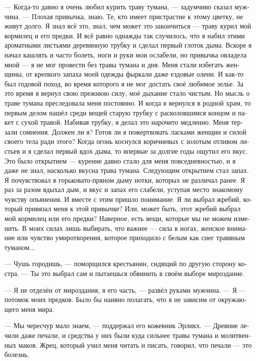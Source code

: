 \documentclass[a4paper,12pt,fleqn]{book}\usepackage{polyglossia}\setdefaultlanguage[babelshorthands=true]{russian}\setotherlanguage{english}\defaultfontfeatures{Ligatures=TeX,Mapping=tex-text}\usepackage{xcolor}\newcommand{\ml}[3]{#2}
\begin{document}
{--- Когда-то давно я очень любил курить траву тумана, --- задумчиво сказал мужчина.
--- Плохая привычка, знаю.
Те, кто имеет пристрастие к этому цветку, не живут долго.
Я знал всё это, знал, чем может это закончиться --- траву курил мой кормилец и его предки.
И всё равно однажды так случилось, что я набил этими ароматными листьями деревянную трубку и сделал первый глоток дыма.
Вскоре я начал кашлять и часто болеть, ноги и руки мои ослабели, но привычка овладела мной --- я не мог провести без травы тумана и дня.
Меня стали избегать женщины, от крепкого запаха моей одежды фыркали даже ездовые олени.
И как-то был годовой поход, во время которого я не мог достать своё любимое зелье.
За это время я вернул свою прежнюю силу, моё дыхание стало чистым.
Но мысль о траве тумана преследовала меня постоянно.
И когда я вернулся в родной храм, то первым делом нашёл среди вещей старую трубку с расколовшимся концом и пакет с сухой травой.
Набивая трубку, я делал это нарочито медленно.
Меня терзали сомнения.
Должен ли я?
Готов ли я пожертвовать ласками женщин и силой своего тела ради этого?
Когда огонь коснулся коричневых с золотым отливом листьев и я сделал первый вдох дыма, то впервые за долгие годы ощутил его вкус.
Это было открытием --- курение давно стало для меня повседневностью, и я даже не знал, насколько вкусна трава тумана.
Следующим открытием стал запах.
Я почувствовал в горьковато-пряном дыму нотки, которых не различал ранее.
Я раз за разом вдыхал дым, и вкус и запах его слабели, уступая место знакомому чувству опьянения.
И вместе с этим пришло понимание.
Я ли выбрал жребий, который привязал меня к этой привычке?
Или, может быть, этот жребий выбрал мой кормилец или его предки?
Наверное, есть вещи, которые мы не можем изменить.
В моих силах лишь выбирать, что важнее --- сила в ногах, женское внимание или чувство умиротворения, которое приходило с белым как снег травяным туманом...

--- Чушь городишь, --- поморщился крестьянин, сидящий по другую сторону костра.
--- Ты это выбрал сам и пытаешься обвинить в своём выборе мироздание.

--- Я не отделён от мироздания, я его часть, --- развёл руками мужчина.
--- Я --- потомок моих предков.
Было бы наивно полагать, что я не зависим от окружающего меня мира.

--- Мы чересчур мало знаем, --- поддержал его кожевник Эрликх.
--- Древние лечили даже печали, и средства у них были куда сильнее травы тумана и молитвенных маков.
Жрец, который учил меня читать и писать, говорил, что печали --- это болезнь.

}
\end{document}
